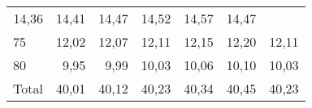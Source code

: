 \begin{tabular}{lllllll}
  \multicolumn{1}{|r}{14,36} &
  \multicolumn{1}{r}{14,41} &
  \multicolumn{1}{r}{14,47} &
  \multicolumn{1}{r}{14,52} &
  \multicolumn{1}{r}{14,57} &
  \multicolumn{1}{r}{14,47} \\
\multicolumn{1}{l}{\hspace{1em}75} &
  \multicolumn{1}{|r}{12,02} &
  \multicolumn{1}{r}{12,07} &
  \multicolumn{1}{r}{12,11} &
  \multicolumn{1}{r}{12,15} &
  \multicolumn{1}{r}{12,20} &
  \multicolumn{1}{r}{12,11} \\
\multicolumn{1}{l}{\hspace{1em}80} &
  \multicolumn{1}{|r}{9,95} &
  \multicolumn{1}{r}{9,99} &
  \multicolumn{1}{r}{10,03} &
  \multicolumn{1}{r}{10,06} &
  \multicolumn{1}{r}{10,10} &
  \multicolumn{1}{r}{10,03} \\
\multicolumn{1}{l}{\hspace{1em}Total} &
  \multicolumn{1}{|r}{40,01} &
  \multicolumn{1}{r}{40,12} &
  \multicolumn{1}{r}{40,23} &
  \multicolumn{1}{r}{40,34} &
  \multicolumn{1}{r}{40,45} &
  \multicolumn{1}{r}{40,23} \\
\cline{1-7}
\end{tabular}
